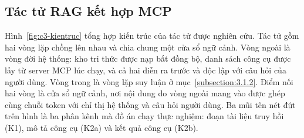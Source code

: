 \documentclass[../DoAn.tex]{subfiles}
\begin{document}
\subsection{Tác tử RAG kết hợp MCP}
\label{subsection:3.3.3}

Hình~\ref{fig:c3-kientruc} tổng hợp kiến trúc của tác tử được nghiên cứu. Tác tử gồm hai vòng lặp chồng lên nhau và chia chung một cửa sổ ngữ cảnh. Vòng ngoài là vòng đời hệ thống: kho tri thức được nạp bất đồng bộ, danh sách công cụ được lấy từ server MCP lúc chạy, và cả hai diễn ra trước và độc lập với câu hỏi của người dùng. Vòng trong là vòng lặp suy luận ở mục~\ref{subsection:3.1.2}. Điểm nối hai vòng là cửa sổ ngữ cảnh, nơi nội dung do vòng ngoài mang vào được ghép cùng chuỗi token với chỉ thị hệ thống và câu hỏi người dùng. Ba mũi tên nét đứt trên hình là ba phân kênh mà đồ án chạy thực nghiệm: đoạn tài liệu truy hồi (K1), mô tả công cụ (K2a) và kết quả công cụ (K2b).
\end{document}
